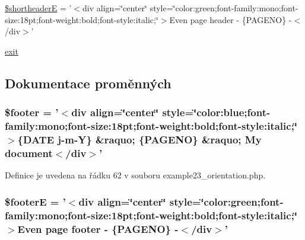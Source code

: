 \begin{DoxyCompactItemize}
\item 
\hyperlink{example23__orientation_8php_add94d6e47b7fd626f97094b0f2bcd5e2}{\$shortheader\-E} = '$<$div align=\char`\"{}center\char`\"{} style=\char`\"{}color\-:green;font-\/family\-:mono;font-\/size\-:18pt;font-\/weight\-:bold;font-\/style\-:italic;\char`\"{}$>$Even page header -\/ \{P\-A\-G\-E\-N\-O\} -\/$<$/div$>$'
\item 
\hyperlink{example23__orientation_8php_a6733eb5f605d09eaede9845835d71c4e}{exit}
\end{DoxyCompactItemize}


\subsection{Dokumentace proměnných}
\hypertarget{example23__orientation_8php_abaa4216c852c51c380dd8f10d3cfe944}{
\subsubsection[{\$footer}]{\setlength{\rightskip}{0pt plus 5cm}\$footer = '$<$div align=\char`\"{}center\char`\"{} style=\char`\"{}color\-:blue;font-\/family\-:mono;font-\/size\-:18pt;font-\/weight\-:bold;font-\/style\-:italic;\char`\"{}$>$\{D\-A\-T\-E j-\/m-\/Y\} \&raquo; \{P\-A\-G\-E\-N\-O\} \&raquo; My document$<$/div$>$'}}\label{example23__orientation_8php_abaa4216c852c51c380dd8f10d3cfe944}


Definice je uvedena na řádku 62 v souboru example23\-\_\-orientation.\-php.

\hypertarget{example23__orientation_8php_a11a5e15badebbec27b59acdf150c2a63}{
\subsubsection[{\$footer\-E}]{\setlength{\rightskip}{0pt plus 5cm}\$footer\-E = '$<$div align=\char`\"{}center\char`\"{} style=\char`\"{}color\-:green;font-\/family\-:mono;font-\/size\-:18pt;font-\/weight\-:bold;font-\/style\-:italic;\char`\"{}$>$Even page footer -\/ \{P\-A\-G\-E\-N\-O\} -\/$<$/div$>$'}}\label{example23__orientation_8php_a11a5e15badebbec27b59acdf150c2a63}


